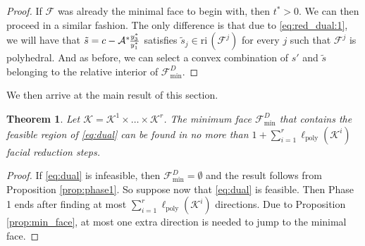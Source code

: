 \documentclass{article}
\newcommand{\reInt}{\mathrm{ri}\,}
\newcommand{\minFaceD}{ {\mathcal{F}_{\min}^D}}
\newcommand{\stdMap}{ {\mathcal{A}}}
\newcommand{\stdCone}{ {\mathcal{K}}}
\newcommand{\stdSpace}{ \mathcal{L}}
\newcommand{\stdFace}{ \mathcal{F}}
\newcommand{\matRange}{{\mathrm{ range } \,}}
\newcommand{\distP}{\ell _{\text{poly}}}
\newcommand{\T}{\ast\hspace{-1pt}}
\newtheorem{theorem}[definition]{Theorem}
\begin{document}
\begin{proof}
If $\stdFace$ was already the minimal face to begin with, then 
$t^* > 0$. We can then  proceed in a 
similar fashion. The only difference is that due to \eqref{eq:red_dual:1}, we 
will have that $\tilde s = c -\stdMap^\T  \frac{y_3^*}{y_1^*} $ satisfies 
$\tilde s _j \in  \reInt (\stdFace ^j)$ for every $j$ such that $\stdFace ^j$ is polyhedral.
And as before, we can select a convex combination of $s'$ and $\tilde s$ belonging to 
the relative interior of $\minFaceD$.
\end{proof}





We then arrive at the main result of this section.
\begin{theorem}\label{theo:fra_bound}
Let $\stdCone = \stdCone ^1\times \ldots \times \stdCone^r$. The minimum face $\minFaceD$ 
that contains the feasible region of \eqref{eq:dual} can be found in no more than 
$1+ \sum _{i=1}^{r} \distP(\stdCone ^i) $ facial reduction steps.
\end{theorem}
\begin{proof}
If \eqref{eq:dual} is infeasible, then $\minFaceD = \emptyset$ and the result 
follows from Proposition \ref{prop:phase1}. So suppose now that 
\eqref{eq:dual} is feasible. Then Phase 1 ends after finding at most 
$\sum _{i=1}^{r} \distP(\stdCone ^i)$ directions. Due to Proposition \ref{prop:min_face}, at most one 
extra direction is needed to jump to the minimal face.
\end{proof}

\end{document}
